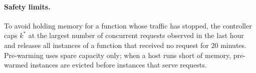 \paragraph{Safety limits.}
To avoid holding memory for a function whose traffic has stopped, the
controller caps $k^{*}$ at the largest number of concurrent requests observed
in the last hour and releases all instances of a function that received no
request for 20 minutes. Pre-warming uses spare capacity only; when a host
runs short of memory, pre-warmed instances are evicted before instances that
serve requests.
